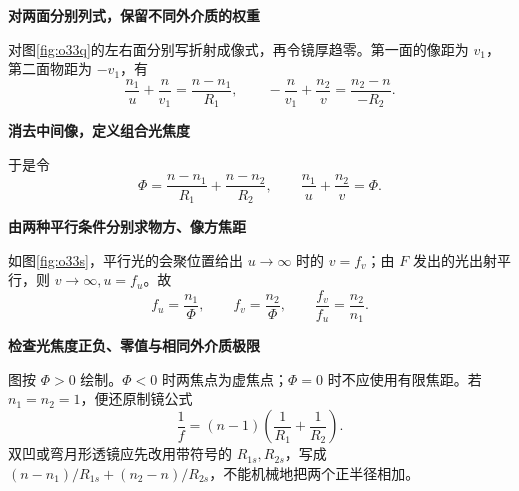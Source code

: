 \begin{solution}\textbf{对两面分别列式，保留不同外介质的权重}\par\nobreak
对图\ref{fig:o33q}的左右面分别写折射成像式，再令镜厚趋零。第一面的像距为 \(v_1\)，第二面物距为 \(-v_1\)，有
\[
 \frac{n_1}{u}+\frac n{v_1}=\frac{n-n_1}{R_1},\qquad
 -\frac n{v_1}+\frac{n_2}{v}=\frac{n_2-n}{-R_2}.
\]


\par\medskip{}\noindent\textbf{消去中间像，定义组合光焦度}\par\nobreak
于是令
\[
 \Phi=\frac{n-n_1}{R_1}+\frac{n-n_2}{R_2},
 \qquad \boxed{\frac{n_1}{u}+\frac{n_2}{v}=\Phi}.
\]



\par\medskip{}\noindent\textbf{由两种平行条件分别求物方、像方焦距}\par\nobreak
如图\ref{fig:o33s}，平行光的会聚位置给出 \(u\to\infty\) 时的 \(v=f_v\)；由 \(F\) 发出的光出射平行，则 \(v\to\infty,u=f_u\)。故
\[
 \boxed{f_u=\frac{n_1}{\Phi},\qquad f_v=\frac{n_2}{\Phi}},\qquad
 \frac{f_v}{f_u}=\frac{n_2}{n_1}.
\]


\par\medskip{}\noindent\textbf{检查光焦度正负、零值与相同外介质极限}\par\nobreak
图按 \(\Phi>0\) 绘制。\(\Phi<0\) 时两焦点为虚焦点；\(\Phi=0\) 时不应使用有限焦距。若 \(n_1=n_2=1\)，便还原制镜公式
\[
 \boxed{\frac1f=(n-1)\left(\frac1{R_1}+\frac1{R_2}\right)}.
\]
双凹或弯月形透镜应先改用带符号的 \(R_{1s},R_{2s}\)，写成 \((n-n_1)/R_{1s}+(n_2-n)/R_{2s}\)，不能机械地把两个正半径相加。
\end{solution}


